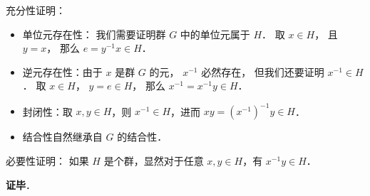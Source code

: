 充分性证明：
\begin{itemize}
\item 单位元存在性： 我们需要证明群 $G$ 中的单位元属于 $H$． 取 $x\in H$， 且 $y = x$， 那么 $e = y^{-1}x \in H$．

\item 逆元存在性：由于 $x$ 是群 $G$ 的元， $x^{-1}$ 必然存在， 但我们还要证明 $x^{-1} \in H$． 取 $x \in H$， $y = e \in H$， 那么 $x^{-1} = x^{-1}y \in H$．

\item 封闭性：取 $x, y\in H$，则 $x^{-1}\in H$，进而 $xy=(x^{-1})^{-1}y\in H$．

\item 结合性自然继承自 $G$ 的结合性．
\end{itemize}

必要性证明： 如果 $H$ 是个群，显然对于任意 $x, y\in H$，有 $x^{-1}y\in H$．

\textbf{证毕}．
